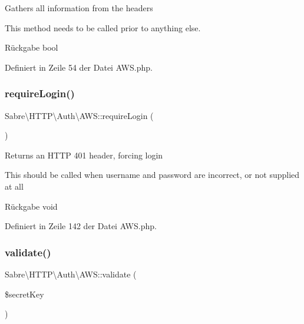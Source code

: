 Gathers all information from the headers

This method needs to be called prior to anything else.

\begin{DoxyReturn}{Rückgabe}
bool 
\end{DoxyReturn}


Definiert in Zeile 54 der Datei A\+W\+S.\+php.

\mbox{\label{class_sabre_1_1_h_t_t_p_1_1_auth_1_1_a_w_s_a7d8af34bc6b9b482c7558045fcdc9639}} 
\subsubsection{\texorpdfstring{require\+Login()}{requireLogin()}}
{\footnotesize\ttfamily Sabre\textbackslash{}\+H\+T\+T\+P\textbackslash{}\+Auth\textbackslash{}\+A\+W\+S\+::require\+Login (\begin{DoxyParamCaption}{ }\end{DoxyParamCaption})}

Returns an H\+T\+TP 401 header, forcing login

This should be called when username and password are incorrect, or not supplied at all

\begin{DoxyReturn}{Rückgabe}
void 
\end{DoxyReturn}


Definiert in Zeile 142 der Datei A\+W\+S.\+php.

\mbox{\label{class_sabre_1_1_h_t_t_p_1_1_auth_1_1_a_w_s_a0db647abf318bdd6e7b929c6927fbd69}} 
\subsubsection{\texorpdfstring{validate()}{validate()}}
{\footnotesize\ttfamily Sabre\textbackslash{}\+H\+T\+T\+P\textbackslash{}\+Auth\textbackslash{}\+A\+W\+S\+::validate (\begin{DoxyParamCaption}\item[{}]{\$secret\+Key }\end{DoxyParamCaption})}

